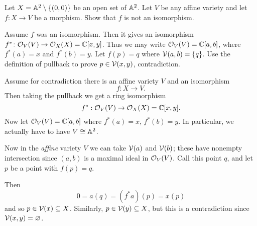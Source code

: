 \begin{problem}
	\gim
	Let $X = \mathbb A^2 \setminus \{ (0,0) \}$ be an open set of $\mathbb A^2$.
	Let $V$ be any affine variety and let $f \colon X \to V$ be a morphism.
	Show that $f$ is not an isomorphism.
	\begin{hint}
		Assume $f$ was an isomorphism.
		Then it gives an isomorphism $f^\ast \colon \mathcal O_V(V) \to \mathcal O_X(X) = \mathbb C[x,y]$.
		Thus we may write $\mathcal O_V(V) = \mathbb C[a,b]$,
		where $f^\ast(a) = x$ and $f^\ast(b) = y$.
		Let $f(p) = q$ where $\mathcal V(a,b) = \{q\}$.
		Use the definition of pullback to prove $p \in \mathcal V(x,y)$, contradiction.
	\end{hint}
	\begin{sol}
		Assume for contradiction there is an affine variety $V$
		and an isomorphism
		\[ f : X \to V. \]
		Then taking the pullback we get a ring isomorphism
		\[ f^\ast : \mathcal O_V(V) \to \mathcal O_X(X) = \mathbb C[x,y]. \]
		Now let $\mathcal O_V(V) = \mathbb C[a,b]$ where $f^\ast(a) = x$, $f^\ast(b) = y$.
		In particular, we actually have to have $V \cong \mathbb A^2$.

		Now in the \emph{affine} variety $V$ we can take $\mathcal V(a)$ and $\mathcal V(b)$;
		these have nonempty intersection since $(a,b)$
		is a maximal ideal in $\mathcal O_V(V)$.
		Call this point $q$, and let $p$ be a point with $f(p) = q$.

		Then
		\[ 0 = a(q) = (f^\ast a)(p) = x(p) \]
		and so $p \in \mathcal V(x) \subseteq X$.
		Similarly, $p \in \mathcal V(y) \subseteq X$,
		but this is a contradiction since $\mathcal V(x,y) = \varnothing$.
	\end{sol}
\end{problem}
